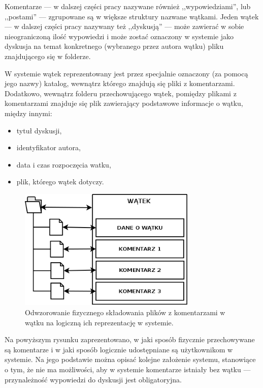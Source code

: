 \documentclass[polish,a4paper,twoside]{ppfcmthesis}
\begin{document}
Komentarze --- w dalszej części pracy nazywane również ,,wypowiedziami'', lub ,,postami'' --- zgrupowane są w większe struktury nazwane wątkami. Jeden wątek --- w dalszej części pracy nazywany też ,,dyskusją'' --- może zawierać w sobie nieograniczoną ilość wypowiedzi i może zostać oznaczony w systemie jako dyskusja na temat konkretnego (wybranego przez autora wątku) pliku znajdującego się w folderze.

W systemie wątek reprezentowany jest przez specjalnie oznaczony (za pomocą jego nazwy) katalog, wewnątrz którego znajdują się pliki z komentarzami. Dodatkowo, wewnątrz folderu przechowującego wątek, pomiędzy plikami z komentarzami znajduje się plik zawierający podstawowe informacje o wątku, między innymi:

\begin{itemize}[noitemsep]
 \item tytuł dyskusji,
 \item identyfikator autora,
 \item data i czas rozpoczęcia watku,
 \item plik, którego wątek dotyczy.
\end{itemize}

\begin{figure}[htb]
  \vspace{5pt}
  \begin{center}
    \includegraphics[width=240pt]{figures/folder-thread.png}
  \end{center}
  \caption{Odwzorowanie fizycznego składowania plików z komentarzami w wątku na logiczną ich reprezentację w systemie.}
\end{figure}

Na powyższym rysunku zaprezentowano, w jaki sposób fizycznie przechowywane są komentarze i w jaki sposób logicznie udostępniane są użytkownikom w systemie. Na jego podstawie można opisać kolejne założenie systemu, stanowiące o tym, że nie ma możliwości, aby w systemie komentarze istniały bez wątku --- przynależność wypowiedzi do dyskusji jest obligatoryjna.
\end{document}
